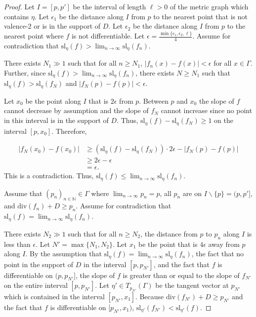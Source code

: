 \documentclass[10pt,a4paper]{amsart}
\begin{document}
	\begin{proof}
		Let $I = [p,p']$ be the interval of length $\ell > 0$ of the metric graph which contains $\eta$. Let $\epsilon_1$ be the distance along $I$ from $p$ to the nearest point that is not valence-2 or is in the support of $D$. Let $\epsilon_2$ be the distance along $I$ from $p$ to the nearest point where $f$ is not differentiable. Let $\epsilon = \frac{\min \{ \epsilon_1, \epsilon_2, \ell \}}{4}$. Assume for contradiction that $\displaystyle \mathrm{sl}_{\eta}(f) > \lim_{n \to \infty} \mathrm{sl}_{\eta}(f_n)$. 
		
		There exists $N_1 \gg 1$ such that for all $n \geq N_1$, $|f_n(x) - f(x)| < \epsilon$ for all $x \in \Gamma$. Further, since $\displaystyle \mathrm{sl}_{\eta}(f) > \lim_{n \to \infty} \mathrm{sl}_{\eta}(f_n)$, there exists $N \geq N_1$ such that $\mathrm{sl}_{\eta}(f) > \mathrm{sl}_{\eta}(f_{N})$ and $|f_{N}(p) - f(p)| < \epsilon$.
		
		Let $x_0$ be the point along $I$ that is $2\epsilon$ from $p$. Between $p$ and $x_0$ the slope of $f$ cannot decrease by assumption and the slope of $f_N$ cannot increase since no point in this interval is in the support of $D$. Thus, $\mathrm{sl}_{\eta}(f) - \mathrm{sl}_{\eta}(f_{N}) \geq 1$ on the interval $[p,x_0]$. Therefore, 
		
		\begin{align*}
			|f_{N}(x_0) - f(x_0)| & \geq (\mathrm{sl}_{\eta}(f) - \mathrm{sl}_{\eta}(f_{N})) \cdot 2\epsilon - |f_{N}(p) - f(p)| \\
			& \geq 2\epsilon - \epsilon \\
			& = \epsilon.
		\end{align*}
		This is a contradiction. Thus, $\displaystyle \mathrm{sl}_{\eta}(f) \leq \lim_{n \to \infty} \mathrm{sl}_{\eta}(f_n)$.
		
		Assume that $(p_n)_{n \in \mathbb{N}} \in \Gamma$ where $\displaystyle \lim_{n \to \infty} p_n = p$, all $p_n$ are on $I \backslash \{ p \} = (p,p']$, and $\mathrm{div}(f_n) + D \geq p_n$. Assume for contradiction that $\displaystyle \mathrm{sl}_{\eta}(f) = \lim_{n \to \infty} \mathrm{sl}_{\eta}(f_n)$.
		
		There exists $N_2 \gg 1$ such that for all $n \geq N_2$, the distance from $p$ to $p_n$ along $I$ is less than $\epsilon$. Let $N' = \max \{ N_1, N_2 \}$. Let $x_1$ be the point that is $4\epsilon$ away from $p$ along $I$. By the assumption that $\displaystyle \mathrm{sl}_{\eta}(f) = \lim_{n \to \infty} \mathrm{sl}_{\eta}(f_n)$, the fact that no point in the support of $D$ in the interval $[p,p_{N'}]$, and the fact that $f$ is differentiable on $(p,p_{N'}]$, the slope of $f$ is greater than or equal to the slope of $f_{N'}$ on the entire interval $[p,p_{N'}]$. Let $\eta' \in T_{p_{N'}}(\Gamma)$ be the tangent vector at $p_{N'}$ which is contained in the interval $[p_{N'},x_1]$. Because $\mathrm{div}(f_{N'}) + D \geq p_{N'}$ and the fact that $f$ is differentiable on $[p_{N'},x_1)$, $\mathrm{sl}_{\eta'}(f_{N'}) < \mathrm{sl}_{\eta'}(f)$.
		

\end{proof}
\end{document}
